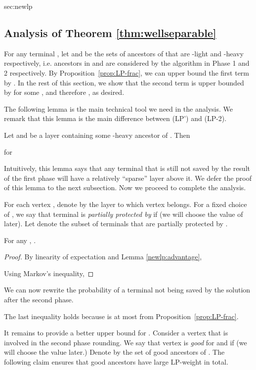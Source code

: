 \begin{appendixextra}{sec:newlp}{\subsection{Analysis of Theorem \ref{thm:wellseparable}}}
For any terminal , let  and  be the sets of ancestors of  that are -light and -heavy respectively, i.e. ancestors in  and  are considered by the algorithm in Phase 1 and 2 respectively. 
By Proposition~\ref{prop:LP-frac}, we can upper bound the first term by . 
In the rest of this section, we show that the second term is upper bounded by  for some , and therefore , as desired.   

The following lemma is the main technical tool we need in the analysis.
We remark that this lemma is the main difference between (LP') and (LP-2).  
\begin{lemma}
\label{newlp:advantage}
Let  and   be a
layer containing some -heavy ancestor of .  
Then 

for  
\end{lemma}

Intuitively, this lemma says that any terminal that is still not saved by the result of the first phase will have a relatively ``sparse'' layer above it.   
We defer the proof of this lemma to the next subsection. 
Now we proceed to complete the analysis.  


For each vertex , denote by  the layer to which vertex  belongs. 
For a fixed choice of , we say that terminal  is {\em partially protected by } if 
 (we will choose the value of  later).
Let  denote the subset of terminals that are partially protected by .  

\begin{claim}
\label{improv:layer:alt:goodterm}
For any ,
. 
\end{claim}

\begin{proof} 
By linearity of expectation and Lemma \ref{newlp:advantage}, 

Using Markov's inequality, 

\end{proof} 


We can now rewrite the probability of a terminal  not being saved by the solution after the second phase.


The last inequality holds because  is at most  from Proposition~\ref{prop:LP-frac}.
 
It remains to provide a better
upper bound for . 
Consider a vertex  that is involved in the second phase rounding.  
We say that vertex   is \emph{good} for  and  if  (we will choose the value  later.)  
Denote by  the set of good ancestors of . 
The following claim ensures that good ancestors have large LP-weight in total. 


\end{appendixextra}
